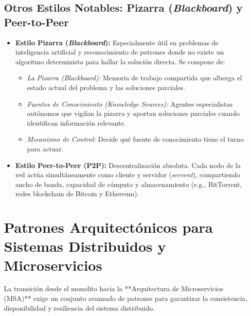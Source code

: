 \subsection{Otros Estilos Notables: Pizarra (\emph{Blackboard}) y Peer-to-Peer}

\begin{itemize}[leftmargin=1.5em]
  \item \textbf{Estilo Pizarra (\emph{Blackboard}):} Especialmente útil en problemas de inteligencia artificial y reconocimiento de patrones donde no existe un algoritmo determinista para hallar la solución directa. Se compone de:
    \begin{itemize}
      \item \emph{La Pizarra (\emph{Blackboard}):} Memoria de trabajo compartida que alberga el estado actual del problema y las soluciones parciales.
      \item \emph{Fuentes de Conocimiento (\emph{Knowledge Sources}):} Agentes especialistas autónomos que vigilan la pizarra y aportan soluciones parciales cuando identifican información relevante.
      \item \emph{Mecanismo de Control:} Decide qué fuente de conocimiento tiene el turno para actuar.
    \end{itemize}
  \item \textbf{Estilo Peer-to-Peer (P2P):} Descentralización absoluta. Cada nodo de la red actúa simultáneamente como cliente y servidor (\emph{servent}), compartiendo ancho de banda, capacidad de cómputo y almacenamiento (e.g., BitTorrent, redes blockchain de Bitcoin y Ethereum).
\end{itemize}

\section{Patrones Arquitectónicos para Sistemas Distribuidos y Microservicios}
\label{sec:patrones-microservicios}

La transición desde el monolito hacia la **Arquitectura de Microservicios (MSA)** exige un conjunto avanzado de patrones para garantizar la consistencia, disponibilidad y resiliencia del sistema distribuido.

